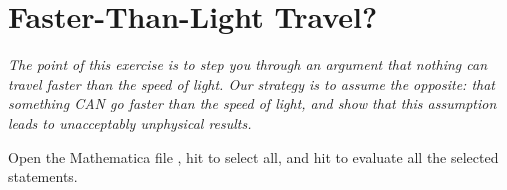 \section{Faster-Than-Light Travel?}

\makelabheader %

\bigskip

\textit{The point of this exercise is to step you through an argument that nothing can travel faster than the speed of light. Our strategy is to assume the opposite: that something CAN go faster than the speed of light, and show that this assumption leads to unacceptably unphysical results.}

Open the Mathematica file , hit  to select all, and hit  to evaluate all the selected statements.

